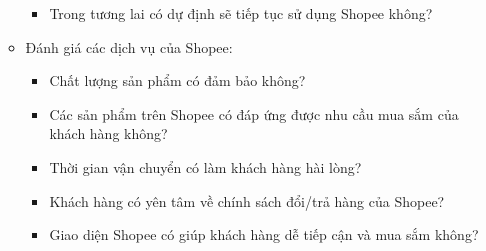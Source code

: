 \documentclass[a4paper]{article}
\theoremstyle{definition}
\begin{document}
\begin{itemize}
\begin{itemize}
\begin{itemize}
        \item Trong tương lai có dự định sẽ tiếp tục sử dụng Shopee không?
    \end{itemize}
    \item Đánh giá các dịch vụ của Shopee:
    \begin{itemize}
        \item Chất lượng sản phẩm có đảm bảo không?
        \item Các sản phẩm trên Shopee có đáp ứng được nhu cầu mua sắm của khách hàng không?
        \item Thời gian vận chuyển có làm khách hàng hài lòng?
        \item Khách hàng có yên tâm về chính sách đổi/trả hàng của Shopee?
        \item Giao diện Shopee có giúp khách hàng dễ tiếp cận và mua sắm không?
    \end{itemize}
\end{itemize}
\newpage

\end{itemize}
\end{document}
